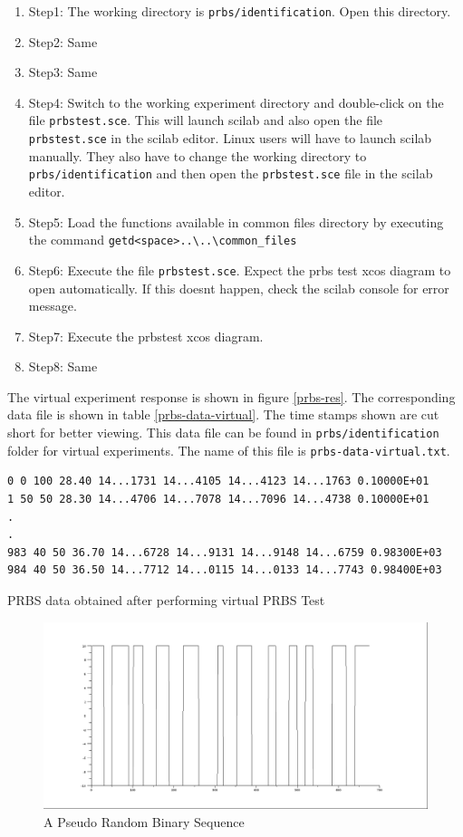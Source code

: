 \begin{enumerate}
\item Step1: The working directory is {\tt  prbs/identification}. Open this directory.
\item Step2: Same
\item Step3: Same
\item Step4:  Switch to the working experiment directory and double-click on the file {\tt prbstest.sce}. This will launch scilab and also open the file {\tt prbstest.sce} in the scilab editor. Linux users will have to launch scilab manually. They also have to change the working directory to {\tt  prbs/identification} and then open the {\tt  prbstest.sce} file in the scilab editor.
\item Step5:  Load the functions available in common files directory by executing the command {\tt getd<space>..\textbackslash ..\textbackslash common\_files\ }
\item Step6: Execute the file {\tt prbstest.sce}.  Expect the prbs test xcos diagram to open automatically. If this doesnt happen, check the scilab console for error message.
\item Step7: Execute the prbstest xcos diagram.
\item Step8: Same
\end{enumerate}


 The virtual experiment response is shown in figure \ref{prbs-res}. The corresponding data file is shown in table \ref{prbs-data-virtual}. The time stamps shown are cut short for better viewing. This data file can be found in {\tt prbs/identification} folder for virtual experiments. The name of this file is {\tt prbs-data-virtual.txt}.



\begin{table}
\begin{verbatim}
0 0 100 28.40 14...1731 14...4105 14...4123 14...1763 0.10000E+01
1 50 50 28.30 14...4706 14...7078 14...7096 14...4738 0.10000E+01
.
.
983 40 50 36.70 14...6728 14...9131 14...9148 14...6759 0.98300E+03
984 40 50 36.50 14...7712 14...0115 14...0133 14...7743 0.98400E+03
\end{verbatim}
\caption{PRBS data obtained after performing virtual PRBS Test}
\label{prbs-data-virtual}
\end{table}


\begin{figure}
\centering
\includegraphics[width=0.7\linewidth]{prbs/prbs-illustration.png}
\caption{A Pseudo Random Binary Sequence}
\label{prbs-fig}
\end{figure}

